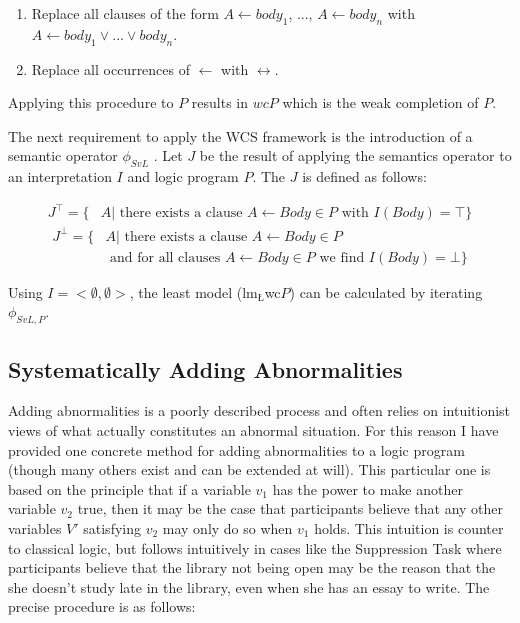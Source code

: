 \documentclass{article}
\begin{document}
\begin{enumerate}
\item Replace all clauses of the form $A \leftarrow body_1$, ..., $A \leftarrow body_n$ with $A \leftarrow body_1 \lor ... \lor body_n$.
\item Replace all occurrences of $\leftarrow$ with $\leftrightarrow$.
\end{enumerate}

Applying this procedure to $P$ results in $wcP$ which is the weak completion of $P$.

The next requirement to apply the WCS framework is the introduction of a semantic operator $\phi_{SvL}$ \citep{stenning2008interpretation}. Let $J$ be the result of applying the semantics operator to an interpretation $I$ and logic program $P$. The $J$ is defined as follows:

\[
\begin{split}
J^\top = \{ & A | \textrm{ there exists a clause } A\leftarrow Body \in P \textrm{ with } I(Body) = \top\}
\end{split}
\]
\[
\begin{split}
J^\bot = \{ &  A | \textrm{ there exists a clause } A \leftarrow Body \in P \\
           & \textrm{ and for all clauses } A \leftarrow Body \in P \textrm{ we find } I(Body) = \bot\}
\end{split}
\]

Using $I=<\emptyset, \emptyset>$, the least model ($\textrm{lm}_\textrm{\L}$wc$P$) can be calculated by iterating $\phi_{SvL,P}$.

\subsection{Systematically Adding Abnormalities} \label{ssec:addAbnormalities}
Adding abnormalities is a poorly described process and often relies on intuitionist views of what actually constitutes an abnormal situation. For this reason I have provided one concrete method for adding abnormalities to a logic program (though many others exist and can be extended at will). This particular one is based on the principle that if a variable $v_1$ has the power to make another variable $v_2$ true, then it may be the case that participants believe that any other variables $V'$ satisfying $v_2$ may only do so when $v_1$ holds. This intuition is counter to classical logic, but follows intuitively in cases like the Suppression Task where participants believe that the library not being open may be the reason that the she doesn't study late in the library, even when she has an essay to write. The precise procedure is as follows:
\end{document}
